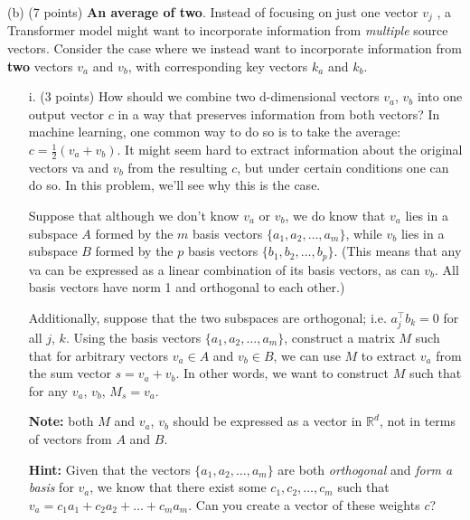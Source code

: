 \documentclass[letterpaper,12pt]{article}
\begin{document}
	\noindent(b) (7 points) \textbf{An average of two}. Instead of focusing on just one vector $v_j$ , a Transformer model might want to incorporate information from \textit{multiple} source vectors. Consider the case where we instead want to incorporate information from \textbf{two} vectors $v_a$ and $v_b$, with corresponding key vectors $k_a$ and $k_b$.
	
	\begin{itemize}
	\item [i.]
	(3 points) How should we combine two d-dimensional vectors $v_a$, $v_b$ into one output vector $c$ in a way that preserves information from both vectors? In machine learning, one common way to do so is to take the average:  $c = \frac{1}{2}(v_a + v_b)$. It might seem hard to extract information about the original vectors va and $v_b$ from the resulting $c$, but under certain conditions one can do so.
	In this problem, we’ll see why this is the case.
			
	\vspace{1em}
			
	Suppose that although we don’t know $v_a$ or $v_b$, we do know that $v_a$ lies in a subspace $A$ formed by the $m$ basis vectors $\{a_1, a_2, \ldots , a_m\}$, while $v_b$ lies in a subspace $B$ formed by the $p$ basis vectors $\{b_1, b_2, \ldots , b_p\}$. (This means that any va can be expressed as a linear combination of its basis vectors, as can $v_b$. All basis vectors have norm 1 and orthogonal to each other.)
			
	Additionally, suppose that the two subspaces are orthogonal; i.e. $a^\top_j b_k = 0$ for all $j$, $k$.
	Using the basis vectors $\{a_1, a_2, \ldots , a_m\}$, construct a matrix $M$ such that for arbitrary vectors $v_a \in A$ and $v_b \in B$, we can use $M$ to extract $v_a$ from the sum vector $s = v_a + v_b$. In other words, we want to construct $M$ such that for any $v_a$, $v_b$, $M_s = v_a$.
			
	\textbf{Note:} both $M$ and $v_a$, $v_b$ should be expressed as a vector in $\mathbb{R}^d$, not in terms of vectors from $A$ and $B$.
			
	\textbf{Hint:} Given that the vectors $\{a_1, a_2, \ldots , a_m\}$ are both \textit{orthogonal} and \textit{form a basis} for $v_a$, we know that there exist some $c_1, c_2, \ldots , c_m$ such that $v_a = c_1a_1 + c_2a_2 + \ldots + c_ma_m$. Can you create a vector of these weights $c$?
			

\end{itemize}
\end{document}
